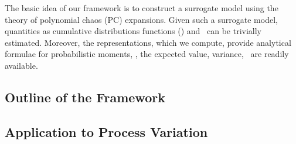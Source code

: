 The basic idea of our framework is to construct a surrogate model using the theory of polynomial chaos (PC) expansions. Given such a surrogate model, quantities as cumulative distributions functions (\cdfs) and \pdfs\ can be trivially estimated. Moreover, the representations, which we compute, provide analytical formulae for probabilistic moments, \ie, the expected value, variance, \etc\ are readily available.

\subsection{Outline of the Framework} 


\subsection{Application to Process Variation} 

